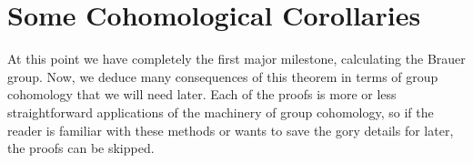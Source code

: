
%
%




\newcommand{\category}[1]{\textsf{#1}}









\title{}
\author{Jack J Garzella}




\section{Some Cohomological Corollaries}

At this point we have completely the first major 
milestone, calculating the Brauer group.
Now, we deduce many consequences of this theorem 
in terms of group cohomology that we will need later.
Each of the proofs is more or less straightforward
applications of the machinery of group cohomology,
so if the reader is familiar with these methods
or wants to save the gory details for later, the 
proofs can be skipped.


